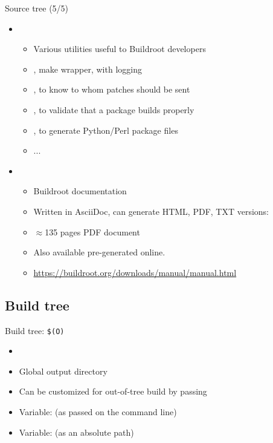 \begin{frame}{Source tree (5/5)}
  \begin{itemize}
  \item {}
    \begin{itemize}
    \item Various utilities useful to Buildroot developers
    \item {}, make wrapper, with logging
    \item {}, to know to whom patches should be sent
    \item {}, to validate that a package builds properly
    \item {},  to generate Python/Perl
      package  files
    \item ...
    \end{itemize}
  \item {}
    \begin{itemize}
    \item Buildroot documentation
    \item Written in AsciiDoc, can generate HTML, PDF, TXT versions:
    \item $\approx$135 pages PDF document
    \item Also available pre-generated online.
    \item \url{https://buildroot.org/downloads/manual/manual.html}
    \end{itemize}
  \end{itemize}
\end{frame}

\subsection{Build tree}

\begin{frame}{Build tree: {\tt \$(O)}}
  \begin{itemize}
  \item {}
  \item Global output directory
  \item Can be customized for out-of-tree build by passing 
  \item Variable:  (as passed on the command line)
  \item Variable:  (as an absolute path)
  \end{itemize}
\end{frame}

